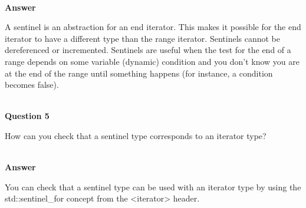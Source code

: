 \hspace*{\fill} \\ %
\noindent
\textbf{Answer}

A sentinel is an abstraction for an end iterator. This makes it possible for the end iterator to have a different type than the range iterator. Sentinels cannot be dereferenced or incremented. Sentinels are useful when the test for the end of a range depends on some variable (dynamic) condition and you don’t know you are at the end of the range until something happens (for instance, a condition becomes false).

\hspace*{\fill} \\ %
\noindent
\textbf{Question 5}

How can you check that a sentinel type corresponds to an iterator type?

\hspace*{\fill} \\ %
\noindent
\textbf{Answer}

You can check that a sentinel type can be used with an iterator type by using the std::sentinel\_for concept from the <iterator> header.












